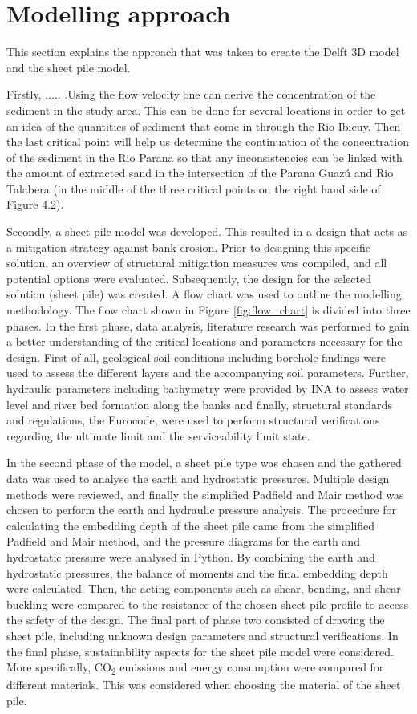 \section{Modelling approach}
This section explains the approach that was taken to create the Delft 3D model and the sheet pile model.  

Firstly, ..... .Using the flow velocity one can derive the concentration of the sediment in the study area. This can be done for several locations in order to get an idea of the quantities of sediment that come in through the Rio Ibicuy. Then the last critical point will help us determine the continuation of the concentration of the sediment in the Rio Parana so that any inconsistencies can be linked with the amount of extracted sand in the intersection of the Parana Guazú and Rio Talabera (in the middle of the three critical points on the right hand side of Figure 4.2).

Secondly, a sheet pile model was developed. This resulted in a design that acts as a mitigation strategy against bank erosion. Prior to designing this specific solution, an overview of structural mitigation measures was compiled, and all potential options were evaluated. Subsequently, the design for the selected solution (sheet pile) was created. A flow chart was used to outline the modelling methodology. The flow chart shown in Figure \ref{fig:flow_chart} is divided into three phases. In the first phase, data analysis, literature research was performed to gain a better understanding of the critical locations and parameters necessary for the design. First of all, geological soil conditions including borehole findings were used to assess the different layers and the accompanying soil parameters. Further, hydraulic parameters including bathymetry were provided by INA to assess water level and river bed formation along the banks and finally, structural standards and regulations, the Eurocode, were used to perform structural verifications regarding the ultimate limit and the serviceability limit state.

In the second phase of the model, a sheet pile type was chosen and the gathered data was used to analyse the earth and hydrostatic pressures. Multiple design methods were reviewed, and finally the simplified Padfield and Mair method was chosen to perform the earth and hydraulic pressure analysis. The procedure for calculating the embedding depth of the sheet pile came from the simplified Padfield and Mair method, and the pressure diagrams for the earth and hydrostatic pressure were analysed in Python. By combining the earth and hydrostatic pressures, the balance of moments and the final embedding depth were calculated. Then, the acting components such as shear, bending, and shear buckling were compared to the resistance of the chosen sheet pile profile to access the safety of the design. The final part of phase two consisted of drawing the sheet pile, including unknown design parameters and structural verifications. In the final phase, sustainability aspects for the sheet pile model were considered. More specifically, CO\textsubscript{2} emissions and energy consumption were compared for different materials. This was considered when choosing the material of the sheet pile.


